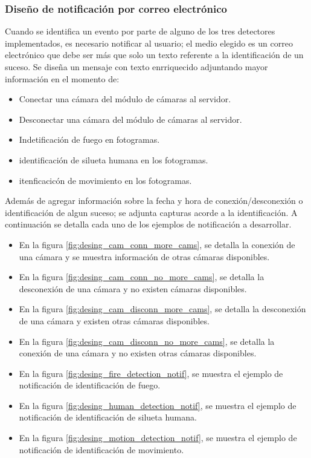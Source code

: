 \subsubsection{Diseño de notificación por correo electrónico}
Cuando se identifica un evento por parte de alguno de los tres detectores implementados, es necesario notificar al usuario; el medio elegido es un correo electrónico que debe ser más que solo un texto referente a la identificación de un suceso. Se diseña un mensaje con texto enrriquecido adjuntando mayor información en el momento de:
\begin{itemize}
    \item Conectar una cámara del módulo de cámaras al servidor.
    \item Desconectar una cámara del módulo de cámaras al servidor.
    \item Indetificación de fuego en fotogramas.
    \item identificación de silueta humana en los fotogramas.
    \item itenficacicón de movimiento en los fotogramas.
\end{itemize}
Además de agregar información sobre la fecha y hora de conexión/desconexión o identificación de algun suceso; se adjunta capturas acorde a la identificación. A continuación se detalla cada uno de los ejemplos de notificación a desarrollar.

\begin{itemize}
    \item En la figura \ref{fig:desing_cam_conn_more_cams}, se detalla la conexión de una cámara y se muestra información de otras cámaras disponibles.
    \item En la figura \ref{fig:desing_cam_conn_no_more_cams}, se detalla la desconexión de una cámara y no existen cámaras disponibles.
    \item En la figura \ref{fig:desing_cam_disconn_more_cams}, se detalla la desconexión de una cámara y existen otras cámaras disponibles.
    \item En la figura \ref{fig:desing_cam_disconn_no_more_cams}, se detalla la conexión de una cámara y no existen otras cámaras disponibles.
    \item En la figura \ref{fig:desing_fire_detection_notif}, se muestra el ejemplo de notificación de identificación de fuego.
    \item En la figura \ref{fig:desing_human_detection_notif}, se muestra el ejemplo de notificación de identificación de silueta humana.
    \item En la figura \ref{fig:desing_motion_detection_notif}, se muestra el ejemplo de notificación de identificación de movimiento.
\end{itemize}


